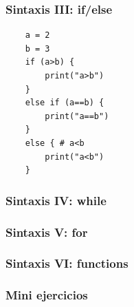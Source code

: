 \documentclass[14pt,aspectratio=169,xcolor=dvipsnames]{beamer}
\begin{document}
\begin{frame}[fragile]\frametitle{Sintaxis III: if/else}
    \begin{verbatim}
    a = 2
    b = 3
    if (a>b) {
        print("a>b")
    }
    else if (a==b) {
        print("a==b")
    }
    else { # a<b
        print("a<b")
    }
    \end{verbatim}
\end{frame}
\begin{frame}[fragile]\frametitle{Sintaxis IV: while}
\end{frame}
\begin{frame}[fragile]\frametitle{Sintaxis V: for}
\end{frame}
\begin{frame}[fragile]\frametitle{Sintaxis VI: functions}
\end{frame}
\begin{frame}
    \maketitle
\end{frame}
\begin{frame}[noframenumbering]\frametitle{Mini ejercicios}
\end{frame}
\end{document}
